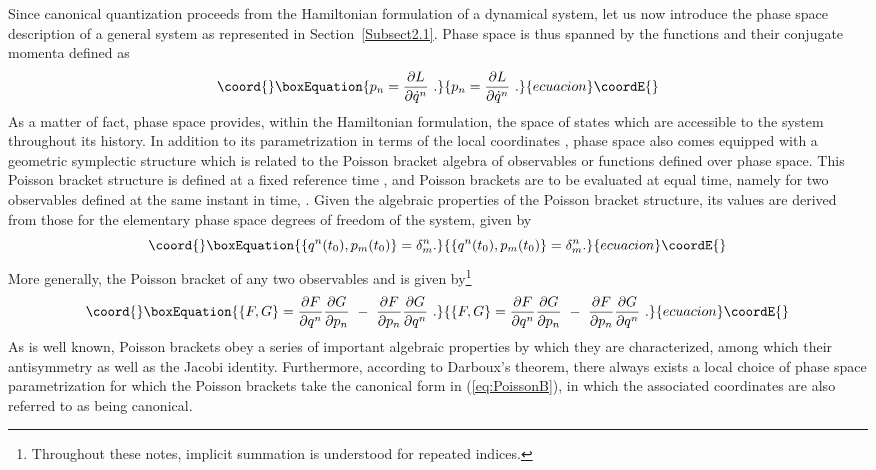 \documentclass[a4paper,11pt]{article}
\begin{document}
Since canonical quantization proceeds from the Hamiltonian formulation
of a dynamical system, let us now introduce the phase space description
of a general system as represented in Section~\ref{Subsect2.1}. Phase space
is thus spanned by the functions \coordHE{} and their conjugate momenta
\coordHE{} defined as
\begin{equation}\coord{}\boxEquation{
p_n=\frac{\partial L}{\partial\dot{q}^n}\ .
}{
p_n=\frac{\partial L}{\partial\dot{q}^n}\ .
}{ecuacion}\coordE{}\end{equation}
As a matter of fact, phase space provides, within the Hamiltonian
formulation, the space of states which are accessible to the system
throughout its history. In addition to its parametrization in terms of
the local coordinates \coordHE{}, phase space also comes equipped with
a geometric symplectic structure which is related to the Poisson bracket
algebra of observables or functions defined over phase space. This Poisson
bracket structure is defined at a fixed reference time \coordHE{}, and Poisson
brackets are to be evaluated at equal time, namely for two observables
defined at the same instant in time, \coordHE{}. Given the algebraic 
properties of the Poisson bracket structure, its values are derived from 
those for the elementary phase space degrees of freedom \coordHE{} of the 
system, given by
\begin{equation}\coord{}\boxEquation{
\{q^n(t_0),p_m(t_0)\}=\delta^n_m .
\label{eq:PoissonB}
}{
\{q^n(t_0),p_m(t_0)\}=\delta^n_m .
}{ecuacion}\coordE{}\end{equation}
More generally, the Poisson bracket of any two observables \coordHE{} and
\coordHE{} is given by\footnote{Throughout these notes, implicit summation
is understood for repeated indices.}
\begin{equation}\coord{}\boxEquation{
\{F,G\}=\frac{\partial F}{\partial q^n}\frac{\partial G}{\partial p_n}\ -\
\frac{\partial F}{\partial p_n}\frac{\partial G}{\partial q^n}\ .
}{
\{F,G\}=\frac{\partial F}{\partial q^n}\frac{\partial G}{\partial p_n}\ -\
\frac{\partial F}{\partial p_n}\frac{\partial G}{\partial q^n}\ .
}{ecuacion}\coordE{}\end{equation}
As is well known, Poisson brackets obey a series of important algebraic 
pro\-per\-ties by which they are characterized, among which their antisymmetry
as well as the Jacobi identity. Furthermore, according to Darboux's theorem,
there always exists a local choice of phase space parametrization for
which the Poisson brackets take the canonical form in (\ref{eq:PoissonB}),
in which the associated coordinates are also referred to as being canonical.
\end{document}
